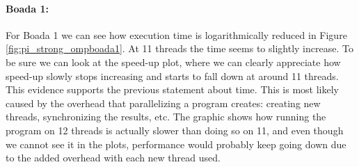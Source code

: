 \documentclass[12]{article}
\begin{document}
\paragraph{Boada 1:}
For Boada 1 we can see how execution time is logarithmically reduced in Figure \ref{fig:pi_strong_ompboada1}. At 11 threads the time seems to slightly increase. To be sure we can look at the speed-up plot, where we can clearly appreciate how speed-up slowly stops increasing and starts to fall down at around 11 threads. This evidence supports the previous statement about time. This is most likely caused by the overhead that parallelizing a program creates: creating new threads, synchronizing the results, etc. The graphic shows how running the program on 12 threads is actually slower than doing so on 11, and even though we cannot see it in the plots, performance would probably keep going down due to the added overhead with each new thread used.
\end{document}
